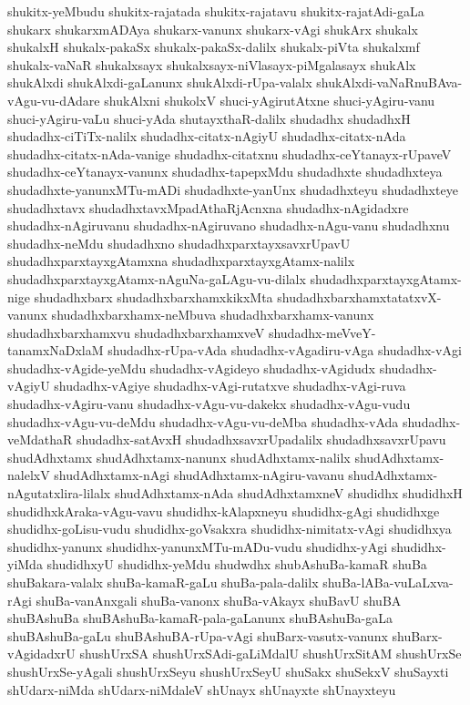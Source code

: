 {shukitx-yeMbudu
shukitx-rajatada
shukitx-rajatavu
shukitx-rajatAdi-gaLa
shukarx
shukarxmADAya
shukarx-vanunx
shukarx-vAgi
shukArx
shukalx
shukalxH
shukalx-pakaSx
shukalx-pakaSx-dalilx
shukalx-piVta
shukalxmf
shukalx-vaNaR
shukalxsayx
shukalxsayx-niVlasayx-piMgalasayx
shukAlx
shukAlxdi
shukAlxdi-gaLanunx
shukAlxdi-rUpa-valalx
shukAlxdi-vaNaRnuBAva-vAgu-vu-dAdare
shukAlxni
shukolxV
shuci-yAgirutAtxne
shuci-yAgiru-vanu
shuci-yAgiru-vaLu
shuci-yAda
shutayxthaR-dalilx
shudadhx
shudadhxH
shudadhx-ciTiTx-nalilx
shudadhx-citatx-nAgiyU
shudadhx-citatx-nAda
shudadhx-citatx-nAda-vanige
shudadhx-citatxnu
shudadhx-ceYtanayx-rUpaveV
shudadhx-ceYtanayx-vanunx
shudadhx-tapepxMdu
shudadhxte
shudadhxteya
shudadhxte-yanunxMTu-mADi
shudadhxte-yanUnx
shudadhxteyu
shudadhxteye
shudadhxtavx
shudadhxtavxMpadAthaRjAcnxna
shudadhx-nAgidadxre
shudadhx-nAgiruvanu
shudadhx-nAgiruvano
shudadhx-nAgu-vanu
shudadhxnu
shudadhx-neMdu
shudadhxno
shudadhxparxtayxsavxrUpavU
shudadhxparxtayxgAtamxna
shudadhxparxtayxgAtamx-nalilx
shudadhxparxtayxgAtamx-nAguNa-gaLAgu-vu-dilalx
shudadhxparxtayxgAtamx-nige
shudadhxbarx
shudadhxbarxhamxkikxMta
shudadhxbarxhamxtatatxvX-vanunx
shudadhxbarxhamx-neMbuva
shudadhxbarxhamx-vanunx
shudadhxbarxhamxvu
shudadhxbarxhamxveV
shudadhx-meVveY-tanamxNaDxlaM
shudadhx-rUpa-vAda
shudadhx-vAgadiru-vAga
shudadhx-vAgi
shudadhx-vAgide-yeMdu
shudadhx-vAgideyo
shudadhx-vAgidudx
shudadhx-vAgiyU
shudadhx-vAgiye
shudadhx-vAgi-rutatxve
shudadhx-vAgi-ruva
shudadhx-vAgiru-vanu
shudadhx-vAgu-vu-dakekx
shudadhx-vAgu-vudu
shudadhx-vAgu-vu-deMdu
shudadhx-vAgu-vu-deMba
shudadhx-vAda
shudadhx-veMdathaR
shudadhx-satAvxH
shudadhxsavxrUpadalilx
shudadhxsavxrUpavu
shudAdhxtamx
shudAdhxtamx-nanunx
shudAdhxtamx-nalilx
shudAdhxtamx-nalelxV
shudAdhxtamx-nAgi
shudAdhxtamx-nAgiru-vavanu
shudAdhxtamx-nAgutatxlira-lilalx
shudAdhxtamx-nAda
shudAdhxtamxneV
shudidhx
shudidhxH
shudidhxkAraka-vAgu-vavu
shudidhx-kAlapxneyu
shudidhx-gAgi
shudidhxge
shudidhx-goLisu-vudu
shudidhx-goVsakxra
shudidhx-nimitatx-vAgi
shudidhxya
shudidhx-yanunx
shudidhx-yanunxMTu-mADu-vudu
shudidhx-yAgi
shudidhx-yiMda
shudidhxyU
shudidhx-yeMdu
shudwdhx
shubAshuBa-kamaR
shuBa
shuBakara-valalx
shuBa-kamaR-gaLu
shuBa-pala-dalilx
shuBa-lABa-vuLaLxva-rAgi
shuBa-vanAnxgali
shuBa-vanonx
shuBa-vAkayx
shuBavU
shuBA
shuBAshuBa
shuBAshuBa-kamaR-pala-gaLanunx
shuBAshuBa-gaLa
shuBAshuBa-gaLu
shuBAshuBA-rUpa-vAgi
shuBarx-vasutx-vanunx
shuBarx-vAgidadxrU
shushUrxSA
shushUrxSAdi-gaLiMdalU
shushUrxSitAM
shushUrxSe
shushUrxSe-yAgali
shushUrxSeyu
shushUrxSeyU
shuSakx
shuSekxV
shuSayxti
shUdarx-niMda
shUdarx-niMdaleV
shUnayx
shUnayxte
shUnayxteyu
}
